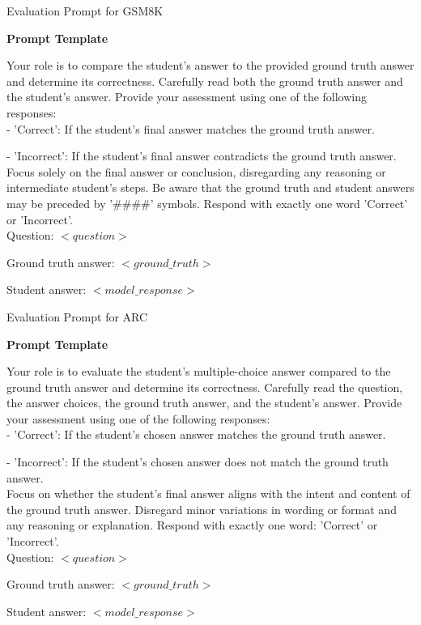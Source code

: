 \begin{prompt}{Evaluation Prompt for GSM8K}{}


\textbf{Prompt Template}

Your role is to compare the student's answer to the provided ground truth answer and determine its correctness. Carefully read both the ground truth answer and the student's answer. Provide your assessment using one of the following responses:
\\

- 'Correct': If the student's final answer matches the ground truth answer.

- 'Incorrect': If the student's final answer contradicts the ground truth answer.
\\

Focus solely on the final answer or conclusion, disregarding any reasoning or intermediate student's steps. Be aware that the ground truth and student answers may be preceded by '\#\#\#\#' symbols. Respond with exactly one word 'Correct' or 'Incorrect'.
\\

Question:
$<question>$

Ground truth answer:
$<ground\_truth>$

Student answer:
$<model\_response>$

\end{prompt}



\begin{prompt}{Evaluation Prompt for ARC}{}


\textbf{Prompt Template}

Your role is to evaluate the student's multiple-choice answer compared to the ground truth answer and determine its correctness. Carefully read the question, the answer choices, the ground truth answer, and the student's answer. Provide your assessment using one of the following responses:
\\

- 'Correct': If the student's chosen answer matches the ground truth answer.

- 'Incorrect': If the student's chosen answer does not match the ground truth answer.
\\

Focus on whether the student's final answer aligns with the intent and content of the ground truth answer. Disregard minor variations in wording or format and any reasoning or explanation. Respond with exactly one word: 'Correct' or 'Incorrect'.
\\

Question:
$<question>$

Ground truth answer:
$<ground\_truth>$

Student answer:
$<model\_response>$

\end{prompt}







